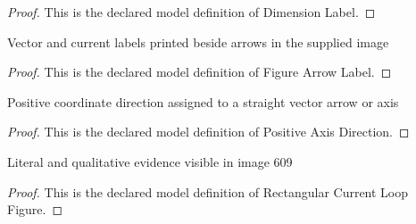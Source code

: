 \begin{proof}
  This is the declared model definition of Dimension Label.
\end{proof}
\begin{definition}
  \label{def:physics:phyx-mini-0609:phyxminiproblems-problemphyxmini0609-figurearrowlabel}
  Vector and current labels printed beside arrows in the supplied image
\end{definition}
\begin{proof}
  This is the declared model definition of Figure Arrow Label.
\end{proof}
\begin{definition}
  \label{def:physics:phyx-mini-0609:phyxminiproblems-problemphyxmini0609-positiveaxisdirection}
  Positive coordinate direction assigned to a straight vector arrow or axis
\end{definition}
\begin{proof}
  This is the declared model definition of Positive Axis Direction.
\end{proof}
\begin{definition}
  \label{def:physics:phyx-mini-0609:phyxminiproblems-problemphyxmini0609-rectangularcurrentloopfigure}
  Literal and qualitative evidence visible in image 609
\end{definition}
\begin{proof}
  This is the declared model definition of Rectangular Current Loop Figure.
\end{proof}

